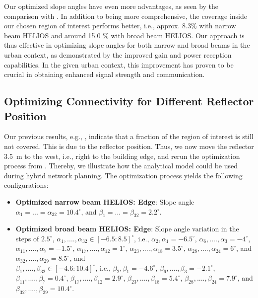 Our optimized slope angles have even more advantages, as seen by the comparison with  . In addition to being more comprehensive, the coverage inside our chosen region of interest performs better, i.e., approx. \num{8.3}\% with narrow beam HELIOS and around \num{15.0} \% with broad beam HELIOS. Our approach is thus effective in optimizing slope angles for both narrow and broad beams in the urban context, as demonstrated by the improved gain and power reception capabilities. In the given urban context, this improvement has proven to be crucial in obtaining enhanced signal strength and communication.
\subsection{Optimizing Connectivity for Different Reflector Position}\label{Optimizing Connectivity with Different Reflector Positions}
Our previous results, e.g., , indicate that a fraction of the region of interest is still not covered. This is due to the reflector position. Thus, we now move the reflector \SI{3.5}{\meter} to the west, i.e., right to the building edge, and rerun the optimization process from . Thereby, we illustrate how the analytical model could be used during hybrid network planning. The optimization process yields the following configurations:
\begin{itemize}
	\item \textbf{Optimized narrow beam HELIOS: Edge}: Slope angle $\alpha_{1}=...=\alpha_{32}=\num{10.4}^\circ$, and $\beta_{1}=...=\beta_{32}=\num{2.2}^\circ$.
	\item \textbf{Optimized broad beam HELIOS: Edge}: Slope angle variation in the steps of $\num{2.5}^\circ$, 	$\alpha_{1},....,\alpha_{32} \in [\num{-6.5}:\num{8.5}]^\circ$, i.e., $\alpha_{2}, \alpha_{1}= \num{-6.5}^\circ$, $\alpha_{6}, ...., \alpha_{3}=  \num{-4}^\circ$, $\alpha_{11}, ...., \alpha_{7}= \num{-1.5}^\circ$, $\alpha_{17}, ...., \alpha_{12}= \num{1}^\circ$, $\alpha_{23}, ...., \alpha_{18}= \num{3.5}^\circ$, $\alpha_{28}, ...., \alpha_{24}= \num{6}^\circ$, and $\alpha_{32}, ...., \alpha_{29}= \num{8.5}^\circ$,
	and \\
	$\beta_{1},....,\beta_{32} \in [\num{-4.6}:\num{10.4}]^\circ$, i.e., $\beta_{2}, \beta_{1}= \num{-4.6}^\circ$, $\beta_{6}, ...., \beta_{3}=  \num{-2.1}^\circ$, $\beta_{11}, ...., \beta_{7}= \num{0.4}^\circ$, $\beta_{17}, ...., \beta_{12}= \num{2.9}^\circ$, $\beta_{23}, ...., \beta_{18}= \num{5.4}^\circ$, $\beta_{28}, ...., \beta_{24}= \num{7.9}^\circ$, and $\beta_{32}, ...., \beta_{29}= \num{10.4}^\circ$. 
\end{itemize}
